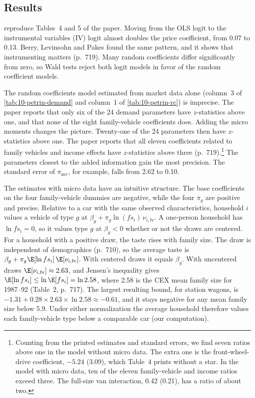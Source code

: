 \subsection{Results}\label{sec:10-petrin-results}

  reproduce Tables~4 and 5 of the paper.
Moving from the OLS logit to the instrumental variables (IV) logit almost doubles the price coefficient, from 0.07 to
0.13. Berry, Levinsohn and Pakes found the same pattern, and it shows that instrumenting matters (p.~719). Many random
coefficients differ significantly from zero, so Wald tests reject both logit models in favor of the random
coefficient models.

The random coefficients model estimated from market data alone (column~3 of \cref{tab:10-petrin-demand} and
column~1 of \cref{tab:10-petrin-rc}) is imprecise. The paper reports that only six of the 24 demand parameters have
$z$-statistics above one, and that none of the eight family-vehicle coefficients does. Adding the micro moments
changes the picture. Twenty-one of the 24 parameters then have $z$-statistics above one. The paper reports that all
eleven coefficients related to family vehicles and income effects have $z$-statistics above three (p.~719).\footnote{Counting from the printed estimates and standard errors, we find seven ratios above one in the model
without micro data. The extra one is the front-wheel-drive coefficient, $-5.24$ (3.09), which Table~4 prints without
a star. In the model with micro data, ten of the eleven family-vehicle and income ratios exceed three. The full-size
van interaction, 0.42 (0.21), has a ratio of about two.}
The parameters closest to the added information gain the most precision. The standard error of $\pi_{\mathrm{mv}}$,
for example, falls from 2.62 to 0.10.

The estimates with micro data have an intuitive structure. The base coefficients on the four family-vehicle dummies
are negative, while the four $\pi_g$ are positive and precise. Relative to a car with the same observed
characteristics, household $i$ values a vehicle of type $g$ at $\beta_g + \pi_g\ln(fs_i)\,\nu_{i,\mathrm{fv}}$. A
one-person household has $\ln fs_i = 0$, so it values type $g$ at $\beta_g < 0$ whether or not the draws are centered.
For a household with a positive draw, the taste rises with family size. The draw is independent of demographics
(p.~710), so the average taste is $\beta_g + \pi_g\E[\ln fs_i]\,\E[\nu_{i,\mathrm{fv}}]$. With centered draws it equals
$\beta_g$. With uncentered draws $\E[\nu_{i,\mathrm{fv}}] \approx 2.63$, and Jensen's inequality gives $\E[\ln fs_i]
\le \ln\E[fs_i] = \ln 2.58$, where 2.58 is the CEX mean family size for 1987--92 (Table~2, p.~717). The largest resulting bound,
for station wagons, is $-1.31 + 0.28 \times 2.63 \times \ln 2.58 \approx -0.61$, and it stays negative for any mean
family size below 5.9. Under either normalization the
average household therefore values each family-vehicle type below a comparable car (our computation).

